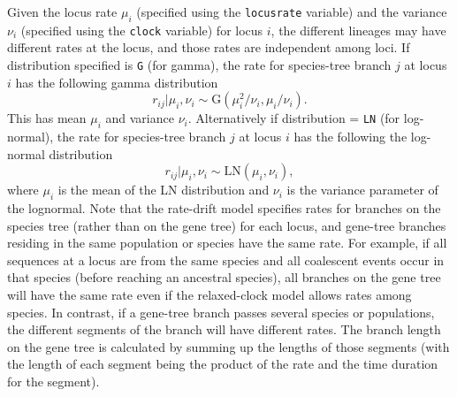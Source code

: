 \documentclass{book}
\numberwithin{equation}{section} \renewcommand{\baselinestretch}{0.55}
\begin{document}
Given the locus rate $\mu_i$ (specified using the \texttt{locusrate}
variable) and the variance $\nu_i$ (specified using the \texttt{clock}
variable) for locus $i$, the different lineages may have different
rates at the locus, and those rates are independent among loci.  If
distribution specified is \texttt{G} (for gamma), the rate for
species-tree branch $j$ at locus $i$ has the following gamma
distribution
\begin{equation}
  r_{ij} | \mu_i, \nu_i \sim \mathrm{G}(\mu_i^2/\nu_i, \mu_i/\nu_i).
\end{equation}
This has mean $\mu_i$ and variance $\nu_i$.  Alternatively if
distribution = \texttt{LN} (for log-normal), the rate for species-tree
branch $j$ at locus $ i $ has the following the log-normal
distribution
\begin{equation}
  r_{ij} | \mu_i, \nu_i \sim \mathrm{LN}(\mu_i, \nu_i),
\end{equation}
where $\mu_i$ is the mean of the LN distribution and $\nu_i$ is the
variance parameter of the lognormal.  Note that the rate-drift model
specifies rates for branches on the species tree (rather than on the
gene tree) for each locus, and gene-tree branches residing in the same
population or species have the same rate.  For example, if all
sequences at a locus are from the same species and all coalescent
events occur in that species (before reaching an ancestral species),
all branches on the gene tree will have the same rate even if the
relaxed-clock model allows rates among species.  In contrast, if a
gene-tree branch passes several species or populations, the different
segments of the branch will have different rates.  The branch length
on the gene tree is calculated by summing up the lengths of those
segments (with the length of each segment being the product of the
rate and the time duration for the segment).
\end{document}
